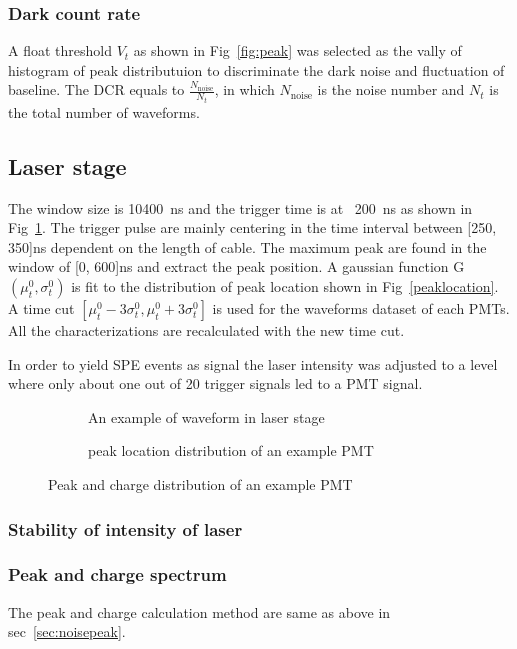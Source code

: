 \subsubsection{Dark count rate}
A float threshold $V_{t}$ as shown in Fig~\ref{fig:peak} was selected as the vally of histogram of peak distributuion to discriminate the dark noise and fluctuation of baseline. The DCR equals to $\frac{N_{\mathrm{noise}}}{N_{t}}$, in which $N_{\mathrm{noise}}$ is the noise number and $N_{t}$ is the total number of waveforms.
\subsection{Laser stage}
The window size is \SI{10400}{ns} and the trigger time is at ~\SI{200}{ns} as shown in Fig~\ref{fig:triggerwaveform}. The trigger pulse are mainly centering in the time interval between [250, 350]ns dependent on the length of cable. The maximum peak are found in the window of [0, 600]ns and extract the peak position. A gaussian function G$(\mu_t^0,\sigma_t^0)$ is fit to the distribution of peak location shown in Fig~\ref{peaklocation}. A time cut $[\mu_t^0-3\sigma_t^0, \mu_t^0+3\sigma_t^0]$ is used for the waveforms dataset of each PMTs. All the characterizations are recalculated with the new time cut.

In order to yield SPE events as signal the laser intensity was adjusted to a level where only
about one out of 20 trigger signals led to a PMT signal.

\begin{figure}
    \centering
    \begin{subfigure}[b]{0.35\textwidth}
        \caption{An example of waveform in laser stage}
        \label{fig:triggerwaveform}
    \end{subfigure}
    \begin{subfigure}[b]{0.35\textwidth}
        \caption{peak location distribution of an example PMT}%
        \label{fig:peaklocation}
    \end{subfigure}
    \caption{Peak and charge distribution of an example PMT}
\end{figure}
\subsubsection{Stability of intensity of laser}
\subsubsection{Peak and charge spectrum}
\label{sec:triggerpeak}
The peak and charge calculation method are same as above in sec~\ref{sec:noisepeak}.

